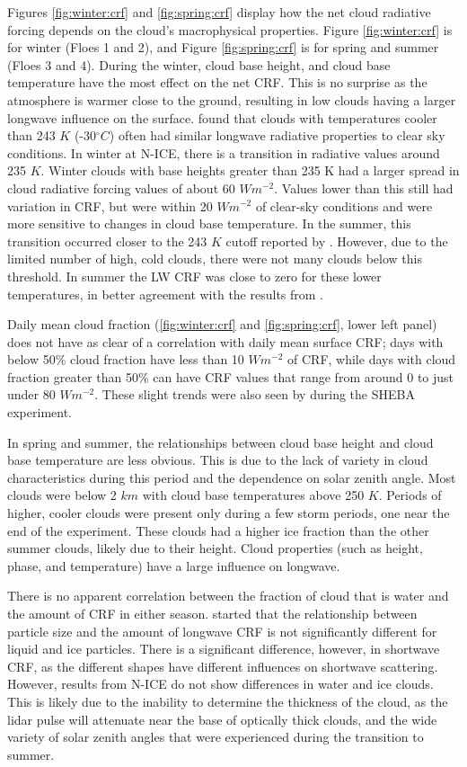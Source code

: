 Figures \ref{fig:winter:crf} and \ref{fig:spring:crf} display how the net cloud radiative forcing depends on the cloud's macrophysical properties. Figure \ref{fig:winter:crf} is for winter (Floes 1 and 2), and Figure \ref{fig:spring:crf} is for spring and summer (Floes 3 and 4). During the winter, cloud base height, and cloud base temperature have the most effect on the net CRF. This is no surprise as the atmosphere is warmer close to the ground, resulting in low clouds having a larger longwave influence on the surface. \citet{shupe:2004} found that clouds with temperatures cooler than 243 $K$ (-30$^{\circ}C$) often had similar longwave radiative properties to clear sky conditions. In winter at N-ICE, there is a transition in radiative values around 235 $K$. Winter clouds with base heights greater than 235 K had a larger spread in cloud radiative forcing values of about 60 $Wm^{-2}$. Values lower than this still had variation in CRF, but were within 20 $Wm^{-2}$ of clear-sky conditions and were more sensitive to changes in cloud base temperature. In the summer, this transition occurred closer to the 243 $K$ cutoff reported by \citet{shupe:2004}. However, due to the limited number of high, cold clouds, there were not many clouds below this threshold. In summer the LW CRF was close to zero for these lower temperatures, in better agreement with the results from \citet{shupe:2004}. 

Daily mean cloud fraction (\ref{fig:winter:crf} and \ref{fig:spring:crf}, lower left panel) does not have as clear of a correlation with daily mean surface CRF; days with below 50$\%$ cloud fraction have less than 10 $Wm^{-2}$ of CRF, while days with cloud fraction greater than 50$\%$ can have CRF values that range from around 0 to just under 80 $Wm^{-2}$. These slight trends were also seen by \citet{shupe:2004} during the SHEBA experiment. 

In spring and summer, the relationships between cloud base height and cloud base temperature are less obvious. This is due to the lack of variety in cloud characteristics during this period and the dependence on solar zenith angle. Most clouds were below 2 $km$ with cloud base temperatures above 250 $K$. Periods of higher, cooler clouds were present only during a few storm periods, one near the end of the experiment. These clouds had a higher ice fraction than the other summer clouds, likely due to their height. Cloud properties (such as height, phase, and temperature) have a large influence on longwave.

There is no apparent correlation between the fraction of cloud that is water and the amount of CRF in either season. \citet{schweiger:1999} started that the relationship between particle size and the amount of longwave CRF is not significantly different for liquid and ice particles. There is a significant difference, however, in shortwave CRF, as the different shapes have different influences on shortwave scattering. However, results from N-ICE do not show differences in water and ice clouds. This is likely due to the inability to determine the thickness of the cloud, as the lidar pulse will attenuate near the base of optically thick clouds, and the wide variety of solar zenith angles that were experienced during the transition to summer. 

